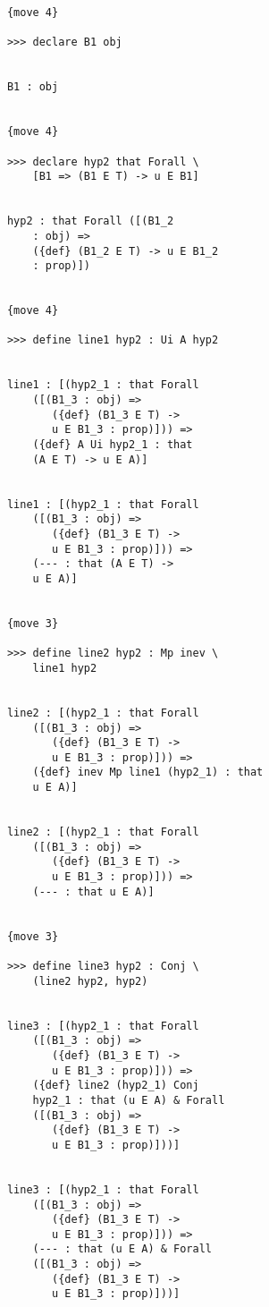 \documentclass[12pt]{article}
\begin{document}
\begin{verbatim}
            {move 4}

            >>> declare B1 obj


            B1 : obj


            {move 4}

            >>> declare hyp2 that Forall \
                [B1 => (B1 E T) -> u E B1]


            hyp2 : that Forall ([(B1_2 
                : obj) => 
                ({def} (B1_2 E T) -> u E B1_2 
                : prop)])


            {move 4}

            >>> define line1 hyp2 : Ui A hyp2


            line1 : [(hyp2_1 : that Forall 
                ([(B1_3 : obj) => 
                   ({def} (B1_3 E T) -> 
                   u E B1_3 : prop)])) => 
                ({def} A Ui hyp2_1 : that 
                (A E T) -> u E A)]


            line1 : [(hyp2_1 : that Forall 
                ([(B1_3 : obj) => 
                   ({def} (B1_3 E T) -> 
                   u E B1_3 : prop)])) => 
                (--- : that (A E T) -> 
                u E A)]


            {move 3}

            >>> define line2 hyp2 : Mp inev \
                line1 hyp2


            line2 : [(hyp2_1 : that Forall 
                ([(B1_3 : obj) => 
                   ({def} (B1_3 E T) -> 
                   u E B1_3 : prop)])) => 
                ({def} inev Mp line1 (hyp2_1) : that 
                u E A)]


            line2 : [(hyp2_1 : that Forall 
                ([(B1_3 : obj) => 
                   ({def} (B1_3 E T) -> 
                   u E B1_3 : prop)])) => 
                (--- : that u E A)]


            {move 3}

            >>> define line3 hyp2 : Conj \
                (line2 hyp2, hyp2)


            line3 : [(hyp2_1 : that Forall 
                ([(B1_3 : obj) => 
                   ({def} (B1_3 E T) -> 
                   u E B1_3 : prop)])) => 
                ({def} line2 (hyp2_1) Conj 
                hyp2_1 : that (u E A) & Forall 
                ([(B1_3 : obj) => 
                   ({def} (B1_3 E T) -> 
                   u E B1_3 : prop)]))]


            line3 : [(hyp2_1 : that Forall 
                ([(B1_3 : obj) => 
                   ({def} (B1_3 E T) -> 
                   u E B1_3 : prop)])) => 
                (--- : that (u E A) & Forall 
                ([(B1_3 : obj) => 
                   ({def} (B1_3 E T) -> 
                   u E B1_3 : prop)]))]



\end{verbatim}
\end{document}
